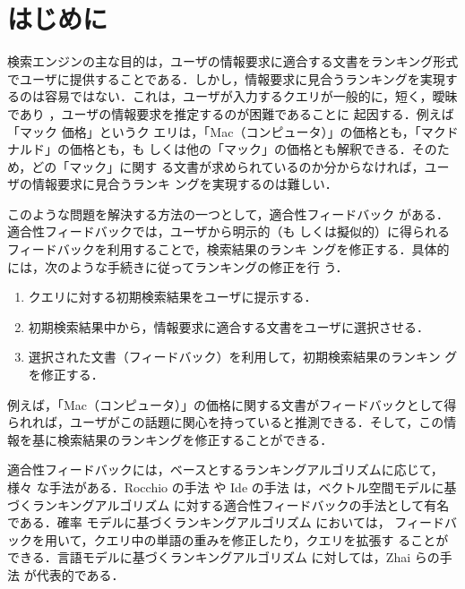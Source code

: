 \documentclass[japanese]{jnlp_1.4}
\begin{document}
\maketitle

\section{はじめに} \label{sec:introduction}

検索エンジンの主な目的は，ユーザの情報要求に適合する文書をランキング形式
でユーザに提供することである．しかし，情報要求に見合うランキングを実現す
るのは容易ではない．これは，ユーザが入力するクエリが一般的に，短く，曖昧
であり \cite{Jansen2000}，ユーザの情報要求を推定するのが困難であることに
起因する．例えば「マック \textvisiblespace \hspace{0.1zw} 価格」というク
エリは，「Mac（コンピュータ）」の価格とも，「マクドナルド」の価格とも，も
しくは他の「マック」の価格とも解釈できる．そのため，どの「マック」に関す
る文書が求められているのか分からなければ，ユーザの情報要求に見合うランキ
ングを実現するのは難しい．

このような問題を解決する方法の一つとして，適合性フィードバック
\cite{Rocchio1971} がある．適合性フィードバックでは，ユーザから明示的（も
しくは擬似的）に得られるフィードバックを利用することで，検索結果のランキ
ングを修正する．具体的には，次のような手続きに従ってランキングの修正を行
う．
\begin{enumerate}
 \item クエリに対する初期検索結果をユーザに提示する．
 \item 初期検索結果中から，情報要求に適合する文書をユーザに選択させる．
 \item 選択された文書（フィードバック）を利用して，初期検索結果のランキン
       グを修正する．
\end{enumerate}
例えば，「Mac（コンピュータ）」の価格に関する文書がフィードバックとして得
られれば，ユーザがこの話題に関心を持っていると推測できる．そして，この情
報を基に検索結果のランキングを修正することができる．

適合性フィードバックには，ベースとするランキングアルゴリズムに応じて，様々
な手法がある．Rocchio の手法 \cite{Rocchio1971}や Ide の手法
\cite{Ide1971}は，ベクトル空間モデルに基づくランキングアルゴリズム
\cite{Salton1975}に対する適合性フィードバックの手法として有名である．確率
モデルに基づくランキングアルゴリズム \cite{SparckJones2000}においては，
フィードバックを用いて，クエリ中の単語の重みを修正したり，クエリを拡張す
ることができる．言語モデルに基づくランキングアルゴリズム
\cite{Ponte1998}に対しては，Zhai らの手法 \cite{Zhai2001}が代表的である．
\end{document}
